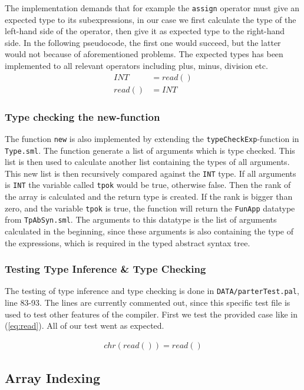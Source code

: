 \documentclass[10pt]{article}
\begin{document}
The implementation demands that for example the \texttt{assign} operator must give an expected type to its subexpressions, in our case we first calculate the type of the left-hand side of the operator, then give it as expected type to the right-hand side. In the following pseudocode, the first one would succeed, but the latter would not because of aforementioned problems. The expected types has been implemented to all relevant operators including plus, minus, division etc.
\begin{align}
INT &= read()\\
read() &= INT
\end{align}

\subsubsection{Type checking the new-function}
The function \texttt{new} is also implemented by extending the \texttt{typeCheckExp}-function in \texttt{Type.sml}. The function generate a list of arguments which is type checked. This list is then used to calculate another list containing the types of all arguments. This new list is then recursively compared against the \texttt{INT} type. If all arguments is \texttt{INT} the variable called \texttt{tpok} would be true, otherwise false. Then the rank of the array is calculated and the return type is created. If the rank is bigger than zero, and the variable \texttt{tpok} is true, the function will return the \texttt{FunApp} datatype from \texttt{TpAbSyn.sml}. The arguments to this datatype is the list of arguments calculated in the beginning, since these arguments is also containing the type of the expressions, which is required in the typed abstract syntax tree.

\subsubsection{Testing Type Inference \& Type Checking}
The testing of type inference and type checking is done in \texttt{DATA/parterTest.pal}, line 83-93. The lines are currently commented out, since this specific test file is used to test other features of the compiler. First we test the provided case like in (\ref{eq:read}). All of our test went as expected.

\begin{align}
\label{eq:read}
chr(read()) = read()
\end{align}

\subsection{Array Indexing}
\end{document}

